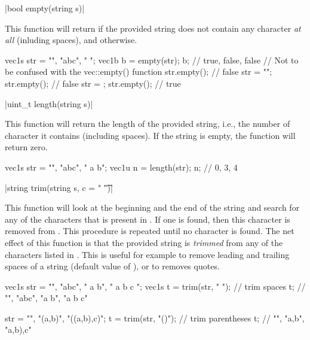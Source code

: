 \funcitem \vectorfunc \cppinline|bool empty(string s)| 

This function will return \cpptrue if the provided string does not contain any character \emph{at all} (inluding spaces), and \cppfalse otherwise.

\begin{example}
\begin{cppcode}
vec1s str = {"", "abc", "   "};
vec1b b = empty(str);
b; // {true, false, false}
// Not to be confused with the vec::empty() function
str.empty(); // false
str = {""};
str.empty(); // false
str = {};
str.empty(); // true
\end{cppcode}
\end{example}

\funcitem \vectorfunc \cppinline|uint_t length(string s)| 

This function will return the length of the provided string, i.e., the number of character it contains (including spaces). If the string is empty, the function will return zero.

\begin{example}
\begin{cppcode}
vec1s str = {"", "abc", " a b"};
vec1u n = length(str);
n; // {0, 3, 4}
\end{cppcode}
\end{example}

\funcitem \vectorfunc \cppinline|string trim(string s, c = " \t")| 

This function will look at the beginning and the end of the string  and search for any of the characters that is present in . If one is found, then this character is removed from . This procedure is repeated until no character is found. The net effect of this function is that the provided string  is \emph{trimmed} from any of the characters listed in . This is useful for example to remove leading and trailing spaces of a string (default value of ), or to removes quotes.

\begin{example}
\begin{cppcode}
vec1s str = {"", "abc", " a b", " a b c  "};
vec1s t = trim(str, " "); // trim spaces
t; // {"", "abc", "a b", "a b c"}

str = {"", "(a,b)", "((a,b),c)"};
t = trim(str, "()"); // trim parentheses
t; // {"", "a,b", "a,b),c"}
\end{cppcode}
\end{example}

